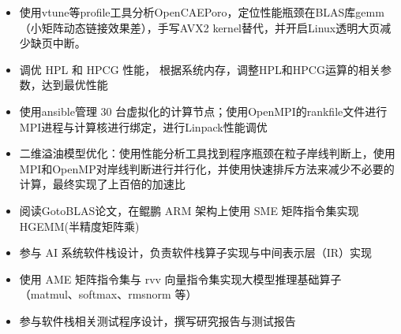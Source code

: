 
\begin{itemize}
  \item 使用vtune等profile工具分析OpenCAEPoro，定位性能瓶颈在BLAS库gemm（小矩阵动态链接效果差），手写AVX2 kernel替代，并开启Linux透明大页减少缺页中断。
  \item 调优 HPL 和 HPCG 性能， 根据系统内存，调整HPL和HPCG运算的相关参数，达到最优性能
\end{itemize}

\begin{itemize}
  \item 使用ansible管理 30 台虚拟化的计算节点；使用OpenMPI的rankfile文件进行MPI进程与计算核进行绑定，进行Linpack性能调优
\end{itemize}

\begin{itemize}
  \item 二维溢油模型优化：使用性能分析工具找到程序瓶颈在粒子岸线判断上，使用MPI和OpenMP对岸线判断进行并行化，并使用快速排斥方法来减少不必要的计算，最终实现了上百倍的加速比
\end{itemize}

\begin{itemize}
  \item 阅读GotoBLAS论文，在鲲鹏 ARM 架构上使用 SME 矩阵指令集实现 HGEMM(半精度矩阵乘)
\end{itemize}


\begin{itemize}
  \item 参与 AI 系统软件栈设计，负责软件栈算子实现与中间表示层（IR）实现
  \item 使用 AME 矩阵指令集与 rvv 向量指令集实现大模型推理基础算子（matmul、softmax、rmsnorm 等）
  \item 参与软件栈相关测试程序设计，撰写研究报告与测试报告
\end{itemize}

